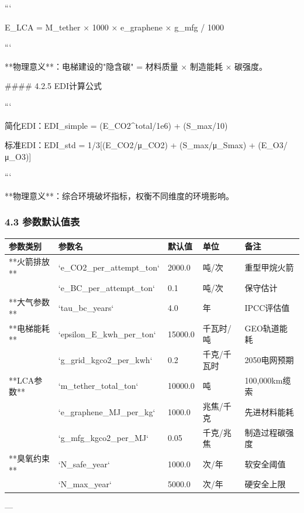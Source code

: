 \documentclass[a4paper,12pt]{article}
\begin{document}
\par
```

\par
E\_LCA = M\_tether × 1000 × e\_graphene × g\_mfg / 1000

\par
```

\par
**物理意义**：电梯建设的"隐含碳" = 材料质量 × 制造能耗 × 碳强度。

\par
#### 4.2.5 EDI计算公式

\par
```

\par
简化EDI：EDI\_simple = (E\_CO2^{total}/1e6) + (S\_max/10)

\par
标准EDI：EDI\_std = 1/3[(E\_CO2/μ\_CO2) + (S\_max/μ\_Smax) + (E\_O3/μ\_O3)]

\par
```

\par
**物理意义**：综合环境破坏指标，权衡不同维度的环境影响。

\par
\subsubsection{4.3 参数默认值表}
\begin{center}
\begin{longtable}{|l|l|l|l|l|}
\hline
参数类别 & 参数名 & 默认值 & 单位 & 备注 \\ \hline
**火箭排放** & `e_CO2_per_attempt_ton` & 2000.0 & 吨/次 & 重型甲烷火箭 \\ \hline
 & `e_BC_per_attempt_ton` & 0.1 & 吨/次 & 保守估计 \\ \hline
**大气参数** & `tau_bc_years` & 4.0 & 年 & IPCC评估值 \\ \hline
**电梯能耗** & `epsilon_E_kwh_per_ton` & 15000.0 & 千瓦时/吨 & GEO轨道能耗 \\ \hline
 & `g_grid_kgco2_per_kwh` & 0.2 & 千克/千瓦时 & 2050电网预期 \\ \hline
**LCA参数** & `m_tether_total_ton` & 10000.0 & 吨 & 100,000km缆索 \\ \hline
 & `e_graphene_MJ_per_kg` & 1000.0 & 兆焦/千克 & 先进材料能耗 \\ \hline
 & `g_mfg_kgco2_per_MJ` & 0.05 & 千克/兆焦 & 制造过程碳强度 \\ \hline
**臭氧约束** & `N_safe_year` & 1000.0 & 次/年 & 软安全阈值 \\ \hline
 & `N_max_year` & 5000.0 & 次/年 & 硬安全上限 \\ \hline
\end{longtable}
\end{center}
---
\end{document}
